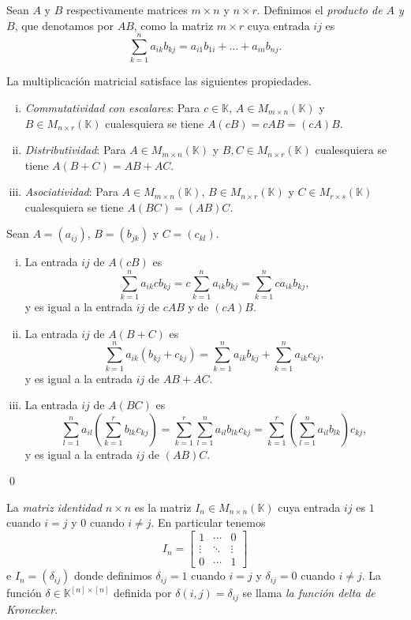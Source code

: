 \begin{defn}
Sean $A$ y $B$ respectivamente matrices $m\times n$ y $n\times r$. Definimos el \emph{producto de $A$ y $B$}, que denotamos por $AB$, como la matriz $m\times r$ cuya entrada $ij$ es
$$\sum_{k=1}^n a_{ik}b_{kj}=a_{i1}b_{1i}+\ldots+a_{in}b_{nj}.$$
\end{defn}

\begin{prop}
La multiplicaci\'on matricial satisface las siguientes propiedades.
\begin{enumerate}[(i)]
\item \emph{Commutatividad con escalares}: Para $c\in \mathbb{K}$, $A\in M_{m\times n}(\mathbb{K})$ y $B\in M_{n\times r}(\mathbb{K})$ cualesquiera se tiene $A(cB)=cAB=(cA)B$.
\item \emph{Distributividad}: Para $A\in M_{m\times n}(\mathbb{K})$ y $B,C\in M_{n\times r}(\mathbb{K})$ cualesquiera se tiene $A(B+C)=AB+AC$.
\item \emph{Asociatividad}: Para $A\in M_{m\times n}(\mathbb{K})$, $B\in M_{n\times r}(\mathbb{K})$ y $C\in M_{r\times s}(\mathbb{K})$ cualesquiera se tiene $A(BC)=(AB)C$.
\end{enumerate}
\end{prop}

\dem Sean $A=(a_{ij})$, $B=(b_{jk})$ y $C=(c_{kl})$.
\begin{enumerate}[(i)]
\item La entrada $ij$ de $A(cB)$ es
$$\sum_{k=1}^n a_{ik}cb_{kj}=c\sum_{k=1}^n a_{ik}b_{kj}=\sum_{k=1}^n ca_{ik}b_{kj},$$
y es igual a la entrada $ij$ de $cAB$ y de $(cA)B$.
\item La entrada $ij$ de $A(B+C)$ es
$$\sum_{k=1}^n a_{ik}(b_{kj}+c_{kj})=\sum_{k=1}^n a_{ik}b_{kj}+\sum_{k=1}^n a_{ik}c_{kj},$$
y es igual a la entrada $ij$ de $AB+AC$.
\item La entrada $ij$ de $A(BC)$ es
$$\sum_{l=1}^n a_{il}\left(\sum_{k=1}^r b_{lk}c_{kj}\right) = \sum_{k=1}^r\sum_{l=1}^n a_{il}b_{lk}c_{kj} = \sum_{k=1}^r\left(\sum_{l=1}^n a_{il}b_{lk}\right)c_{kj},$$
y es igual a la entrada $ij$ de $(AB)C$.
\end{enumerate}
\qed

\begin{defn}
La \emph{matriz identidad $n\times n$} es la matriz $I_n\in M_{n\times n}(\mathbb{K})$ cuya entrada $ij$ es $1$ cuando $i=j$ y $0$ cuando $i\ne j$. En particular tenemos
$$I_n=\left[\begin{array}{ccc}
1 & \cdots & 0\\
\vdots & \ddots & \vdots\\
0 & \cdots & 1
\end{array}\right]$$
e $I_n=(\delta_{ij})$ donde definimos $\delta_{ij}=1$ cuando $i=j$ y $\delta_{ij}=0$ cuando $i\ne j$. La funci\'on $\delta\in \mathbb{K}^{[n]\times [n]}$ definida por $\delta(i,j)=\delta_{ij}$ se llama \emph{la funci\'on delta de Kronecker}.  
\end{defn}

